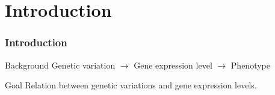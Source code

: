 \section{Introduction}
\begin{frame}
\sectionpage
\end{frame}

\begin{frame}
    \frametitle{Introduction}
    \begin{block}{Background} 
        Genetic variation $\rightarrow$
        Gene expression level $\rightarrow$
        Phenotype
	\end{block}

%      
	\begin{block}{Goal}
		Relation between genetic variations and gene expression levels.
	\end{block}

    
\end{frame}

		


